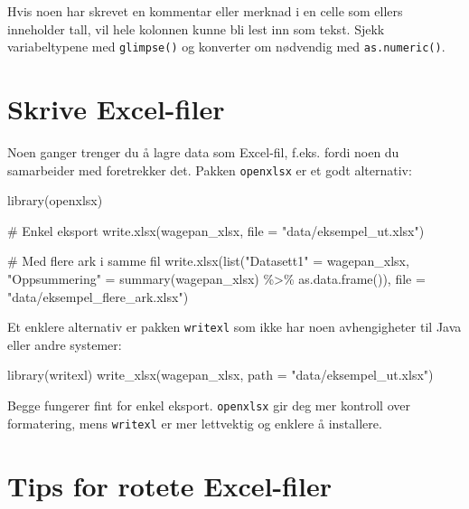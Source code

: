 \documentclass[
  norsk,
  letterpaper,
  DIV=11,
  numbers=noendperiod]{scrreprt}
\newenvironment{Shaded}{\begin{snugshade}}{\end{snugshade}}
\newcommand{\AttributeTok}[1]{\textcolor[rgb]{0.40,0.45,0.13}{#1}}
\newcommand{\CommentTok}[1]{\textcolor[rgb]{0.37,0.37,0.37}{#1}}
\newcommand{\FunctionTok}[1]{\textcolor[rgb]{0.28,0.35,0.67}{#1}}
\newcommand{\NormalTok}[1]{\textcolor[rgb]{0.00,0.23,0.31}{#1}}
\newcommand{\OtherTok}[1]{\textcolor[rgb]{0.00,0.23,0.31}{#1}}
\newcommand{\SpecialCharTok}[1]{\textcolor[rgb]{0.37,0.37,0.37}{#1}}
\newcommand{\StringTok}[1]{\textcolor[rgb]{0.13,0.47,0.30}{#1}}
\theoremstyle{definition}
\theoremstyle{remark}
\begin{document}
Hvis noen har skrevet en kommentar eller merknad i en celle som ellers
inneholder tall, vil hele kolonnen kunne bli lest inn som tekst. Sjekk
variabeltypene med \texttt{glimpse()} og konverter om nødvendig med
\texttt{as.numeric()}.

\section{Skrive Excel-filer}\label{skrive-excel-filer}

Noen ganger trenger du å lagre data som Excel-fil, f.eks. fordi noen du
samarbeider med foretrekker det. Pakken \texttt{openxlsx} er et godt
alternativ:

\begin{Shaded}
\begin{Highlighting}[]
\FunctionTok{library}\NormalTok{(openxlsx)}

\CommentTok{\# Enkel eksport}
\FunctionTok{write.xlsx}\NormalTok{(wagepan\_xlsx, }\AttributeTok{file =} \StringTok{"data/eksempel\_ut.xlsx"}\NormalTok{)}

\CommentTok{\# Med flere ark i samme fil}
\FunctionTok{write.xlsx}\NormalTok{(}\FunctionTok{list}\NormalTok{(}\StringTok{"Datasett1"} \OtherTok{=}\NormalTok{ wagepan\_xlsx,}
                \StringTok{"Oppsummering"} \OtherTok{=} \FunctionTok{summary}\NormalTok{(wagepan\_xlsx) }\SpecialCharTok{\%\textgreater{}\%} \FunctionTok{as.data.frame}\NormalTok{()),}
           \AttributeTok{file =} \StringTok{"data/eksempel\_flere\_ark.xlsx"}\NormalTok{)}
\end{Highlighting}
\end{Shaded}

Et enklere alternativ er pakken \texttt{writexl} som ikke har noen
avhengigheter til Java eller andre systemer:

\begin{Shaded}
\begin{Highlighting}[]
\FunctionTok{library}\NormalTok{(writexl)}
\FunctionTok{write\_xlsx}\NormalTok{(wagepan\_xlsx, }\AttributeTok{path =} \StringTok{"data/eksempel\_ut.xlsx"}\NormalTok{)}
\end{Highlighting}
\end{Shaded}

Begge fungerer fint for enkel eksport. \texttt{openxlsx} gir deg mer
kontroll over formatering, mens \texttt{writexl} er mer lettvektig og
enklere å installere.

\section{Tips for rotete Excel-filer}\label{tips-for-rotete-excel-filer}
\end{document}
